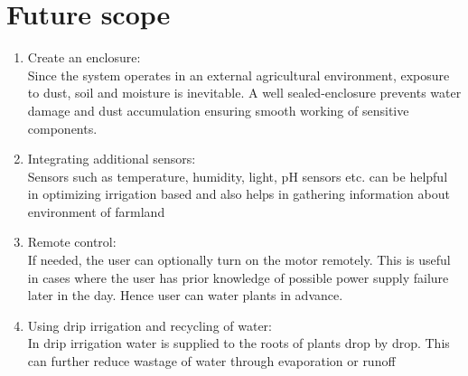 \newpage
\chapter{Future scope}
\begin{enumerate}
	\item Create an enclosure: \\
		Since the system operates in an external agricultural
		environment, exposure to    dust, soil and moisture is
		inevitable. A well sealed-enclosure prevents water damage and
		dust accumulation ensuring smooth working of sensitive components.
	\item Integrating additional sensors: \\
		Sensors such as temperature, humidity, light, pH sensors etc. can
		be helpful in optimizing irrigation based and also helps in
		gathering information about environment of farmland
	\item Remote control: \\
		If needed, the user can optionally turn on the motor remotely.
		This is useful in cases where the user has prior knowledge of
		possible power supply failure later in the day. Hence user can
		water plants in advance.
	\item Using drip irrigation and recycling of water: \\
		In  drip irrigation water is supplied to the roots of plants drop
		by drop. This can further reduce wastage of water through
		evaporation or runoff
\end{enumerate}
